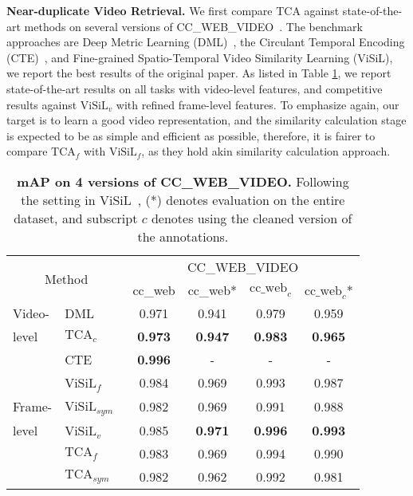 \documentclass[10pt,twocolumn,letterpaper]{article}
\begin{document}
\noindent\textbf{Near-duplicate Video Retrieval.} \label{paragraph:ndvr}
We ﬁrst compare TCA against state-of-the-art methods on several versions of CC\_WEB\_VIDEO~\cite{wu2007practical}. The benchmark approaches are Deep Metric Learning (DML)~\cite{kordopatis2017dml}, the Circulant Temporal Encoding (CTE)~\cite{revaud2013event}, and Fine-grained Spatio-Temporal Video Similarity Learning (ViSiL), we report the best results of the original paper. As listed in Table \ref{tab:ccweb}, we report state-of-the-art results on all tasks with video-level features, and competitive results against $\text{ViSiL}_v$ with refined frame-level features. To emphasize again, our target is to learn a good video representation, and the similarity calculation stage is expected to be as simple and efficient as possible, therefore, it is fairer to compare $\text{TCA}_{f}$ with $\text{ViSiL}_f$, as they hold akin similarity calculation approach. 
\begin{table}[htb]
\setlength{\tabcolsep}{3pt}
\caption{\textbf{mAP on 4 versions of CC\_WEB\_VIDEO.} Following the setting in ViSiL~\cite{kordopatis2019visil}, (*) denotes evaluation on the entire dataset, and subscript $c$ denotes using the cleaned version of the annotations.} \label{tab:ccweb}
{\small
\begin{tabular}{llcccc}
\toprule
\multicolumn{2}{c}{\multirow{2}{*}{Method}} & \multicolumn{4}{c}{CC\_WEB\_VIDEO}        \\
\cmidrule{3-6}
\multicolumn{2}{c}{}                        & cc\_web & cc\_web* & $\text{cc\_web}_c$ & $\text{cc\_web}_c$* \\
\midrule
Video-  & DML~\cite{kordopatis2017dml}         & 0.971   & 0.941    & 0.979    & 0.959     \\
level  & $\text{TCA}_c$       &\textbf{0.973}   & \textbf{0.947}    & \textbf{0.983}    & \textbf{0.965}     \\
\cmidrule{1-6}
                              & CTE~\cite{revaud2013event}         & \textbf{0.996}   & -        & -        & -         \\
                              & $\text{ViSiL}_f$~\cite{kordopatis2019visil}     & 0.984   & 0.969    & 0.993    & 0.987     \\
Frame-                        & $\text{ViSiL}_{sym}$~\cite{kordopatis2019visil}   & 0.982   & 0.969    & 0.991    & 0.988     \\
level                         & $\text{ViSiL}_v$~\cite{kordopatis2019visil}     & 0.985   & \textbf{0.971}    & \textbf{0.996}    & \textbf{0.993} \\
                              & $\text{TCA}_f$       & 0.983   & 0.969    & 0.994    & 0.990     \\
                              & $\text{TCA}_{sym}$   & 0.982    & 0.962    & 0.992    & 0.981     \\
\bottomrule
\end{tabular}
}
\end{table}
\end{document}
